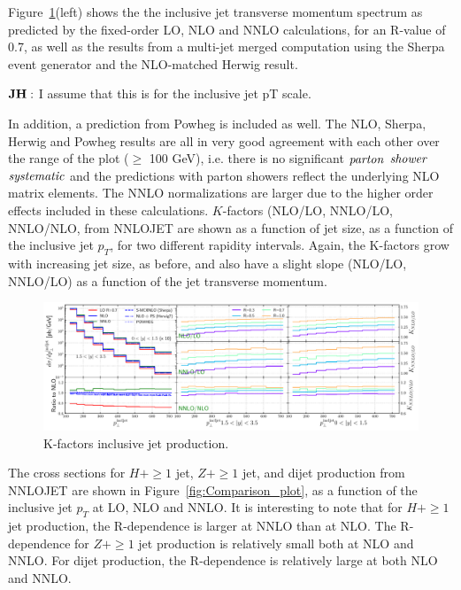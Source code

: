 \documentclass[aps,prd,onecolumn,fleqn,superscriptaddress,groupedaddress,nofootinbib,preprintnumbers,nobalancelastpage]{revtex4}
\begin{document}
Figure~\ref{fig:K-factors_jet}(left)  shows the the inclusive jet transverse momentum spectrum  as predicted by the fixed-order LO, NLO and NNLO calculations, for an R-value of 0.7,  as well as the
results from a multi-jet merged computation using the 
Sherpa event generator and
the NLO-matched 
Herwig result.

$\bf JH:$ I assume that this is for the inclusive jet pT scale.

In addition, a prediction from 
Powheg is included as well. The NLO, 
Sherpa, Herwig and Powheg results are all in very good agreement with each other over the range of the plot ($\ge$ 100 GeV), i.e. there is no significant $\it parton$ $\it shower$ $\it systematic$ and the predictions with parton showers reflect the underlying NLO matrix elements. The NNLO normalizations are larger due to the higher order effects included in these calculations.  $K$-factors (NLO/LO, NNLO/LO, NNLO/NLO, from 
NNLOJET are shown as a function of jet size,  as a function of the 
inclusive jet  $p_T$, for two different rapidity intervals. Again, the K-factors grow with increasing jet size, as before, and also have a slight slope (NLO/LO, NNLO/LO) as a function of the jet transverse momentum. 

\begin{figure}
\includegraphics[width=\textwidth]{plots/Fig_V_14_J_2.pdf}
\caption{K-factors inclusive jet production.}
\label{fig:K-factors_jet}
\end{figure}

The cross sections for $H +\ge1$ jet, $Z +\ge1$ jet, and dijet production from 
NNLOJET are shown in Figure~\ref{fig:Comparison_plot}, as a function of the inclusive jet $p_T$ at LO, NLO and NNLO. It is interesting to note that for $H +\ge1$ jet production, the R-dependence is larger at NNLO than at NLO. The R-dependence for $Z +\ge1$ jet production is relatively small both at NLO and NNLO. For dijet production, the R-dependence is relatively large at both NLO and NNLO. 
\end{document}
